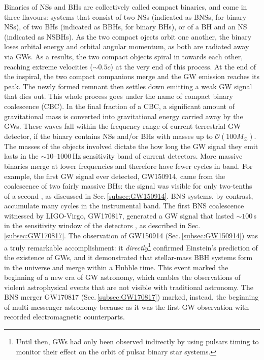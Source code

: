 \documentclass[binding=0.6cm, LaM]{sapthesis}
\begin{document}
        Binaries of NSs and BHs are collectively called compact binaries,
        and come in three flavours: systems that consist of two NSs (indicated as BNSs, for binary NSs), 
	of two BHs (indicated as BBHs, for binary BHs), or of a BH and an NS (indicated as NSBHs).
        As the two compact ojects orbit one another, the binary loses orbital energy and orbital angular momentum, 
	as both are radiated away via GWs.
        As a results, the two compact objects spiral in towards each other, 
	reaching extreme velocities ($\sim 0.5c$) at the very end of this process. 
        At the end of the inspiral, the two compact companions merge and 
	the GW emission reaches its peak. 
	The newly formed remnant then settles down emitting a weak GW signal that dies out.  
	This whole process goes under the name of compact binary coalescence (CBC).
	In the final fraction of a CBC, a significant amount of gravitational mass is converted 
	into gravitational energy carried away by the GWs.  
	These waves fall within the frequency range of current terrestrial GW detector, 
	if the binary contains NSs and/or BHs with masses up to $\mathcal{O}(100M_\odot)$.
        The masses of the objects involved dictate the how long the GW signal they emit 
	lasts in the $\sim 10$--$1000$\,Hz sensitivity band of current detectors.
        More massive binaries merge at lower frequencies and therefore have fewer cycles in band.
        For example, the first GW signal ever detected, GW150914, came from the coalescence of two fairly massive BHs: 
	the signal was visible for only two-tenths of a second \cite{14}, as discussed in Sec.\,\ref{subsec:GW150914}. 
        BNS systems, by contrast, accumulate many cycles in the instrumental band.
        The first BNS coalescence witnessed by LIGO-Virgo, GW170817, 
	generated a GW signal that lasted $\sim 100\,$s in the sensitivity window of the detectors \cite{15}, 
	as described in Sec.\,\ref{subsec:GW170817}.
	The observation of GW150914 (Sec.\,\ref{subsec:GW150914}) was a truly remarkable accomplishment: 
	it \emph{directly}\footnote{Until then, GWs had only been observed indirectly by using pulsars timing to monitor 
        their effect on the orbit of pulsar binary star systems.} confirmed Einstein's prediction of the existence of GWs, 
	and it demonstrated that stellar-mass BBH systems form in the universe and merge within a Hubble time.
	This event marked the beginning of a new era of GW astronomy, 
	which enables the observations of violent astrophysical events that are not visible with traditional astronomy.
	The BNS merger GW170817 (Sec.\,\ref{subsec:GW170817}) marked, instead, the beginning of multi-messenger astronomy 
	because as it was the first GW observation with recorded electromagnetic counterparts.  	
\end{document}
